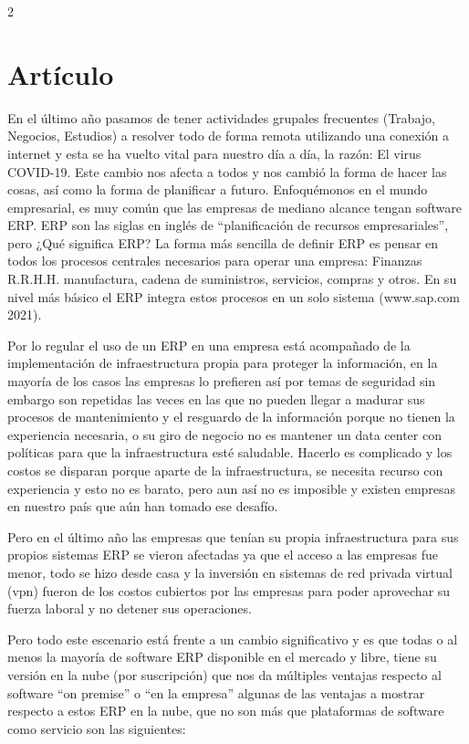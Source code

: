 \documentclass[12pt,spanish,Letterpaper,openany]{book}
\begin{document}
\begin {multicols}{2}

\hypertarget{artuxedculo-6}{%
\section{Artículo}\label{artuxedculo-6}}

En el último año pasamos de tener actividades grupales frecuentes (Trabajo, Negocios,
Estudios) a resolver todo de forma remota utilizando una conexión a internet y esta se ha
vuelto vital para nuestro día a día, la razón: El virus COVID-19. Este cambio nos afecta a
todos y nos cambió la forma de hacer las cosas, así como la forma de planificar a futuro.
Enfoquémonos en el mundo empresarial, es muy común que las empresas de mediano
alcance tengan software ERP. ERP son las siglas en inglés de ``planificación de recursos
empresariales'', pero ¿Qué significa ERP? La forma más sencilla de definir ERP es pensar
en todos los procesos centrales necesarios para operar una empresa: Finanzas R.R.H.H.
manufactura, cadena de suministros, servicios, compras y otros. En su nivel más básico el
ERP integra estos procesos en un solo sistema (www.sap.com 2021).

Por lo regular el uso de un ERP en una empresa está acompañado de la implementación de
infraestructura propia para proteger la información, en la mayoría de los casos las empresas
lo prefieren así por temas de seguridad sin embargo son repetidas las veces en las que no
pueden llegar a madurar sus procesos de mantenimiento y el resguardo de la información
porque no tienen la experiencia necesaria, o su giro de negocio no es mantener un data center
con políticas para que la infraestructura esté saludable. Hacerlo es complicado y los costos se
disparan porque aparte de la infraestructura, se necesita recurso con experiencia y esto no es
barato, pero aun así no es imposible y existen empresas en nuestro país que aún han tomado
ese desafío.

Pero en el último año las empresas que tenían su propia infraestructura para sus propios
sistemas ERP se vieron afectadas ya que el acceso a las empresas fue menor, todo se hizo
desde casa y la inversión en sistemas de red privada virtual (vpn) fueron de los costos
cubiertos por las empresas para poder aprovechar su fuerza laboral y no detener sus
operaciones.

Pero todo este escenario está frente a un cambio significativo y es que todas o al menos la
mayoría de software ERP disponible en el mercado y libre, tiene su versión en la nube (por
suscripción) que nos da múltiples ventajas respecto al software ``on premise'' o ``en la
empresa'' algunas de las ventajas a mostrar respecto a estos ERP en la nube, que no son más
que plataformas de software como servicio son las siguientes:


\end{multicols}
\end{document}
